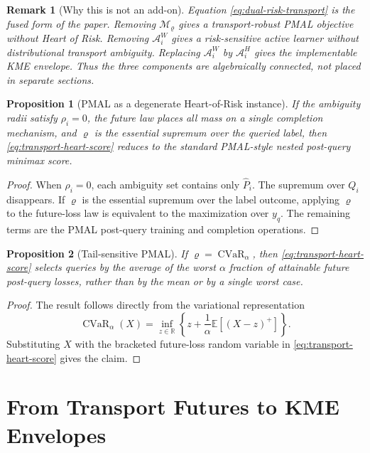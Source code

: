 \documentclass[10pt,journal]{IEEEtran}
\newtheorem{proposition}{Proposition}
\newtheorem{remark}{Remark}
\DeclareMathOperator{\CVaR}{CVaR}
\newcommand{\R}{\mathbb{R}}
\newcommand{\E}{\mathbb{E}}
\newcommand{\Mcal}{\mathcal{M}}
\newcommand{\risk}{\varrho}
\newcommand{\Acal}{\mathcal{A}}
\begin{document}
\begin{remark}[Why this is not an add-on]
Equation \eqref{eq:dual-risk-transport} is the fused form of the paper. Removing $\Mcal_\risk$ gives a transport-robust PMAL objective without Heart of Risk. Removing $\Acal_i^W$ gives a risk-sensitive active learner without distributional transport ambiguity. Replacing $\Acal_i^W$ by $\Acal_i^H$ gives the implementable KME envelope. Thus the three components are algebraically connected, not placed in separate sections.
\end{remark}

\begin{proposition}[PMAL as a degenerate Heart-of-Risk instance]
\label{prop:pmal-degenerate}
If the ambiguity radii satisfy $\rho_i=0$, the future law places all mass on a single completion mechanism, and $\risk$ is the essential supremum over the queried label, then \eqref{eq:transport-heart-score} reduces to the standard PMAL-style nested post-query minimax score.
\end{proposition}

\begin{proof}
When $\rho_i=0$, each ambiguity set contains only $\widehat P_i$. The supremum over $Q_i$ disappears. If $\risk$ is the essential supremum over the label outcome, applying $\risk$ to the future-loss law is equivalent to the maximization over $y_q$. The remaining terms are the PMAL post-query training and completion operations.
\end{proof}

\begin{proposition}[Tail-sensitive PMAL]
\label{prop:tail-sensitive-pmal}
If $\risk=\CVaR_\alpha$, then \eqref{eq:transport-heart-score} selects queries by the average of the worst $\alpha$ fraction of attainable future post-query losses, rather than by the mean or by a single worst case.
\end{proposition}

\begin{proof}
The result follows directly from the variational representation
\begin{equation}
    \CVaR_\alpha(X)=\inf_{z\in\R}\left\{z+\frac{1}{\alpha}\E[(X-z)^+]\right\}.
\end{equation}
Substituting $X$ with the bracketed future-loss random variable in \eqref{eq:transport-heart-score} gives the claim.
\end{proof}

\section{From Transport Futures to KME Envelopes}
\label{sec:kme-envelope-v5}
\end{document}
